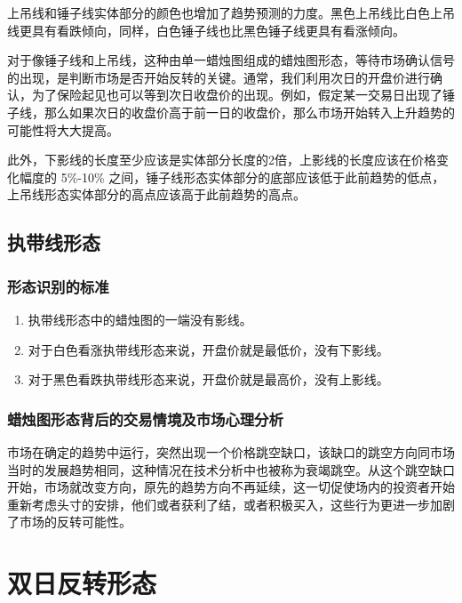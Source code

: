 上吊线和锤子线实体部分的颜色也增加了趋势预测的力度。黑色上吊线比白色上吊线更具有看跌倾向，同样，白色锤子线也比黑色锤子线更具有看涨倾向。

对于像锤子线和上吊线，这种由单一蜡烛图组成的蜡烛图形态，等待市场确认信号的出现，是判断市场是否开始反转的关键。通常，我们利用次日的开盘价进行确认，为了保险起见也可以等到次日收盘价的出现。例如，假定某一交易日出现了锤子线，那么如果次日的收盘价高于前一日的收盘价，那么市场开始转入上升趋势的可能性将大大提高。

此外，下影线的长度至少应该是实体部分长度的2倍，上影线的长度应该在价格变化幅度的 5\%-10\% 之间，锤子线形态实体部分的底部应该低于此前趋势的低点，上吊线形态实体部分的高点应该高于此前趋势的高点。
\subsection{执带线形态}

\subsubsection*{形态识别的标准}
\begin{enumerate}
    \item 执带线形态中的蜡烛图的一端没有影线。
    \item 对于白色看涨执带线形态来说，开盘价就是最低价，没有下影线。
    \item 对于黑色看跌执带线形态来说，开盘价就是最高价，没有上影线。
\end{enumerate}
\subsubsection*{蜡烛图形态背后的交易情境及市场心理分析}
市场在确定的趋势中运行，突然出现一个价格跳空缺口，该缺口的跳空方向同市场当时的发展趋势相同，这种情况在技术分析中也被称为衰竭跳空。从这个跳空缺口开始，市场就改变方向，原先的趋势方向不再延续，这一切促使场内的投资者开始重新考虑头寸的安排，他们或者获利了结，或者积极买入，这些行为更进一步加剧了市场的反转可能性。
\section{双日反转形态}
